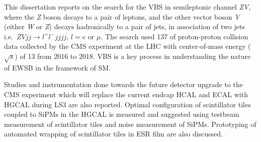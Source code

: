 This dissertation reports on the search for
the \gls{VBS} in semileptonic channel \textit{ZV},
where the \textit{Z} boson decays to a pair of leptons,
and the other vector boson \textit{V} (either \textit{W} or \textit{Z})
decays hadronically to a pair of jets, in association of two jets
i.e.~\( \textit{ZV}jj \rightarrow l^{+}l^-jjjj \), \( l=e \) or \( \mu \).
The search used 137 \fbinv{} of proton-proton collision data collected by
the \gls{CMS} experiment at the \gls{LHC} with
center-of-mass energy (\( \sqrt{s} \)) of 13 \TeV{} from 2016 to 2018.
\gls{VBS} is a key process in understanding the nature of \gls{EWSB} in
the framework of \gls{SM}.

Studies and instrumentation done towards the future detector
upgrade to the \gls{CMS} experiment which will replace
the current endcap \gls{HCAL} and \gls{ECAL} with \gls{HGCAL}
during \gls{LS3} are also reported.
Optimal configuration
of scintillator tiles coupled to \glspl{SiPM}
in the \gls{HGCAL} is measured and suggested using testbeam measurement of
scintillator tiles and noise measurement of \glspl{SiPM}.
Prototyping of automated wrapping of scintillator tiles in \gls{ESR} film
are also discussed.
